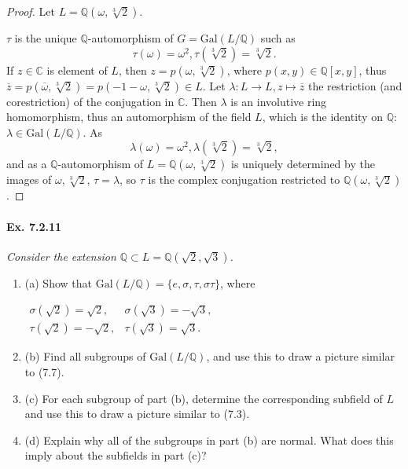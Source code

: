 \documentclass[11pt,a4paper]{article}
\newcommand{\be} {\begin{enumerate}}
\newcommand{\ee} {\end{enumerate}}
\newcommand{\Q}{\mathbb{Q}}
\newcommand{\C}{\mathbb{C}}
\newcommand{\Gal}{\mathrm{Gal}}
\begin{document}
\begin{proof}
Let $L = \Q(\omega, \sqrt[3]{2})$.

$\tau$ is the unique $\Q$-automorphism of $G = \Gal(L/\Q)$ such as $$\tau(\omega) = \omega^2, \tau(\sqrt[3]{2}) = \sqrt[3]{2}.$$
If $z\in \C$ is element of $L$, then $z = p(\omega, \sqrt[3]{2})$, where $p(x,y) \in \Q[x,y]$, thus $\overline{z} = p(\overline{\omega}, \sqrt[3]{2}) = p(-1-\omega,\sqrt[3]{2}) \in L$.
Let $\lambda : L \to L, z \mapsto \overline{z}$  the restriction (and corestriction) of the conjugation in $\C$. Then $\lambda$ is an involutive ring homomorphism, thus an automorphism of the field $L$, which is the identity on $\Q$: $\lambda \in \Gal(L/\Q)$.
As 
$$\lambda(\omega) = \omega^2, \lambda(\sqrt[3]{2}) = \sqrt[3]{2},$$
and as a $\Q$-automorphism of $L = \Q(\omega, \sqrt[3]{2})$ is uniquely determined by the images of $\omega,\sqrt[3]{2}$, $\tau = \lambda$, so $\tau$ is the complex conjugation restricted  to $\Q(\omega, \sqrt[3]{2})$.
\end{proof}

\paragraph{Ex. 7.2.11}

{\it Consider the extension $\Q \subset L = \Q(\sqrt{2},\sqrt{3})$.
\be
\item[(a)] Show that $\Gal(L/\Q) = \{e,\sigma,\tau,\sigma\tau\}$, where
\begin{center}
$
\begin{array}{ll}
  \sigma(\sqrt{2}) = \sqrt{2},& \sigma (\sqrt{3}) = -\sqrt{3},   \\
 \tau(\sqrt{2}) = -\sqrt{2},& \tau (\sqrt{3}) = \sqrt{3} .   
\end{array}
$
\end{center}
\item[(b)] Find all subgroups of $\Gal(L/\Q)$, and use this to draw a picture similar to (7.7).
\item[(c)] For each subgroup of part (b), determine the corresponding subfield of $L$ and use this to draw a picture similar to (7.3).
\item[(d)] Explain why all of the subgroups in part (b) are normal. What does this imply about the subfields in part (c)?
\ee
}
\end{document}
